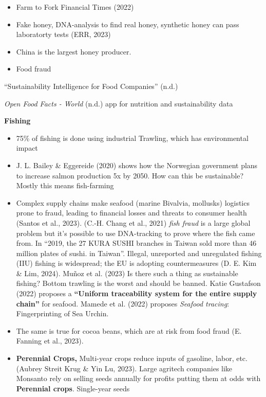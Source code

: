 \documentclass[
  letterpaper,
  DIV=11,
  numbers=noendperiod]{scrartcl}
\begin{document}
\begin{itemize}
\item
  Farm to Fork Financial Times (2022)
\item
  Fake honey, DNA-analysis to find real honey, synthetic honey can pass
  laboratorty tests (ERR, 2023)
\item
  China is the largest honey producer.
\item
  Food fraud
\end{itemize}

{``Sustainability {Intelligence} for {Food Companies}''} (n.d.)

\emph{Open {Food Facts} - {World}} (n.d.) app for nutrition and
sustainability data

\textbf{Fishing}

\begin{itemize}
\item
  75\% of fishing is done using industrial Trawling, which has
  environmental impact
\item
  J. L. Bailey \& Eggereide (2020) shows how the Norwegian government
  plans to increase salmon production 5x by 2050. How can this be
  sustainable? Mostly this means fish-farming
\item
  Complex supply chains make seafood (marine Bivalvia, mollusks)
  logistics prone to fraud, leading to financial losses and threats to
  consumer health (Santos et al., 2023). (C.-H. Chang et al., 2021)
  \emph{fish fraud} is a large global problem but it's possible to use
  DNA-tracking to prove where the fish came from. In ``2019, the 27 KURA
  SUSHI branches in Taiwan sold more than 46 million plates of sushi. in
  Taiwan''. Illegal, unreported and unregulated fishing (IIU) fishing is
  widespread; the EU is adopting countermeasures (D. E. Kim \& Lim,
  2024). Muñoz et al. (2023) Is there such a thing as sustainable
  fishing? Bottom trawling is the worst and should be banned. Katie
  Gustafson (2022) proposes a \textbf{``Uniform traceability system for
  the entire supply chain''} for seafood. Mamede et al. (2022) proposes
  \emph{Seafood tracing}: Fingerprinting of Sea Urchin.
\item
  The same is true for cocoa beans, which are at risk from food fraud
  (E. Fanning et al., 2023).
\item
  \textbf{Perennial Crops,} Multi-year crops reduce inputs of gasoline,
  labor, etc. (Aubrey Streit Krug \& Yin Lu, 2023). Large agritech
  companies like Monsanto rely on selling seeds annually for profits
  putting them at odds with \textbf{Perennial crops}. Single-year seeds

\end{itemize}
\end{document}
